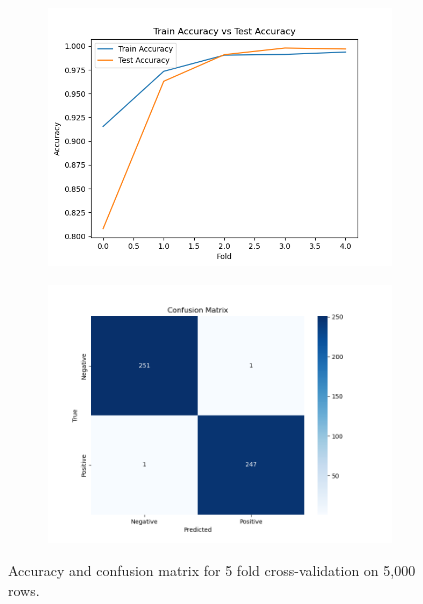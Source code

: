     \begin{figure}[h]
        \centering
        \begin{subfigure}{0.49\textwidth}
            \centering
            \includegraphics[width=\textwidth]{figures/cross_validation_5000_accuracy.png}
        \end{subfigure}
        \begin{subfigure}{0.49\textwidth}
            \centering
            \includegraphics[width=\textwidth]{figures/cross_validation_5000_confusion.png}
        \end{subfigure}
        \caption{Accuracy and confusion matrix for 5 fold cross-validation on 5,000 rows.}
    \end{figure}
    \FloatBarrier

